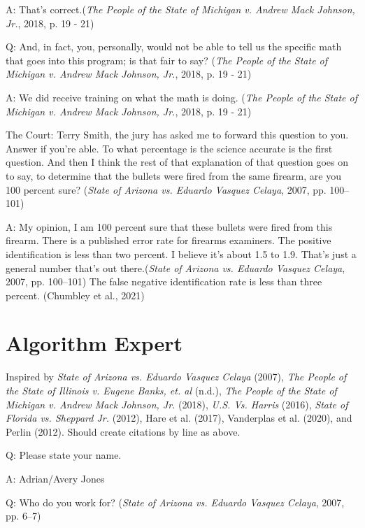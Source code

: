 \documentclass[print]{nuthesis}
\begin{document}
A: That's correct.(\emph{The {People} of the {State} of {Michigan} v. Andrew {Mack} {Johnson}, {Jr.}}, 2018, p. 19 - 21)

Q: And, in fact, you, personally, would not be able to tell us the specific math that goes into this program; is that fair to say? (\emph{The {People} of the {State} of {Michigan} v. Andrew {Mack} {Johnson}, {Jr.}}, 2018, p. 19 - 21)

A: We did receive training on what the math is doing. (\emph{The {People} of the {State} of {Michigan} v. Andrew {Mack} {Johnson}, {Jr.}}, 2018, p. 19 - 21)

The Court: Terry Smith, the jury has asked me to forward this question to you. Answer if you're able.
To what percentage is the science accurate is the first question. And then I think the rest of that explanation of that question goes on to say, to determine that the bullets were fired from the same firearm, are you 100 percent sure? (\emph{State of {Arizona} vs. Eduardo {Vasquez} {Celaya}}, 2007, pp. 100--101)

A: My opinion, I am 100 percent sure that these bullets were fired from this firearm.
There is a published error rate for firearms examiners.
The positive identification is less than two percent.
I believe it's about 1.5 to 1.9. That's just a general number that's out there.(\emph{State of {Arizona} vs. Eduardo {Vasquez} {Celaya}}, 2007, pp. 100--101)
The false negative identification rate is less than three percent. (Chumbley et al., 2021)

\hypertarget{algorithm-expert}{%
\section{Algorithm Expert}\label{algorithm-expert}}

Inspired by \emph{State of {Arizona} vs. Eduardo {Vasquez} {Celaya}} (2007), \emph{The {People} of the {State} of {Illinois} v. Eugene {Banks}, et. al} (n.d.), \emph{The {People} of the {State} of {Michigan} v. Andrew {Mack} {Johnson}, {Jr.}} (2018), \emph{{U.S.} Vs. {Harris}} (2016), \emph{State of {Florida} vs. Sheppard {Jr.}} (2012), Hare et al. (2017), Vanderplas et al. (2020), and Perlin (2012). Should create citations by line as above.

Q: Please state your name.

A: Adrian/Avery Jones

Q: Who do you work for? (\emph{State of {Arizona} vs. Eduardo {Vasquez} {Celaya}}, 2007, pp. 6--7)
\end{document}
